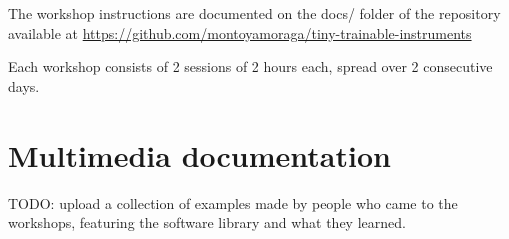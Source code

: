 The workshop instructions are documented on the docs/ folder of the repository available at \url{https://github.com/montoyamoraga/tiny-trainable-instruments}

Each workshop consists of 2 sessions of 2 hours each, spread over 2 consecutive days.


\section{Multimedia documentation}

TODO: upload a collection of examples made by people who came to the workshops, featuring the software library and what they learned.
